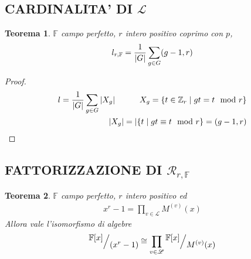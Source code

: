 \documentclass[mathserif]{beamer}
\def\quotient#1#2{%
   \raise1ex\hbox{$#1$}\Big/\lower1ex\hbox{$#2$}%
}
\newtheorem{teorema}{Teorema}
\begin{document}
\subsection{CARDINALITA' DI  $\mathscr{L}$ }
\begin{frame}
   \begin{teorema}
	$\mathbb{F}$ campo perfetto, $r$ intero positivo coprimo con $p$,
	\begin{align*}
	  l_{r,\mathbb{F}} = \frac{1}{\arrowvert G \arrowvert }\sum_{g \in G} (g-1, r)
	\end{align*}
    \end{teorema}
    \begin{proof}
	\begin{align*}
	  l = \frac{1}{\arrowvert G \arrowvert }\sum_{g \in G}\arrowvert X_{g} \arrowvert \qquad \quad
 	   X_{g} = \lbrace t \in \mathbb{Z}_{r} \mid gt = t \mod r \rbrace
 	   \\
 	   \arrowvert X_{g} \arrowvert = \arrowvert \lbrace t \mid  gt \equiv t \mod{r} \rbrace = (g-1, r)
	\end{align*}
    \end{proof}
\end{frame}


\subsection{FATTORIZZAZIONE DI $\mathcal{R}_{r,\mathbb{F}}$ }
\begin{frame}
      \begin{teorema}
        $\mathbb{F}$ campo perfetto, $r$ intero positivo ed
	\begin{align*}
	      x^r-1 = \prod_{v\in \mathscr{L}} M^{(v)}(x)
	\end{align*}
       Allora vale l'isomorfismo di algebre
	\begin{align*}
	    \quotient{\mathbb{F} \lbrack x \rbrack  }{(x^{r} - 1)}
	    \cong
	    \prod_{v\in \mathscr{L}} \quotient{\mathbb{F} \lbrack x \rbrack  }{M^{(v)}(x)}
	\end{align*}
      \end{teorema}
\end{frame}
\end{document}
